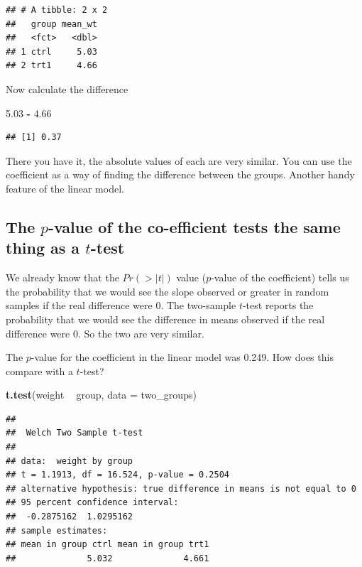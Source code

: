 \documentclass[
]{book}
\newenvironment{Shaded}{\begin{snugshade}}{\end{snugshade}}
\newcommand{\DataTypeTok}[1]{\textcolor[rgb]{0.13,0.29,0.53}{#1}}
\newcommand{\FloatTok}[1]{\textcolor[rgb]{0.00,0.00,0.81}{#1}}
\newcommand{\KeywordTok}[1]{\textcolor[rgb]{0.13,0.29,0.53}{\textbf{#1}}}
\newcommand{\NormalTok}[1]{#1}
\newcommand{\OperatorTok}[1]{\textcolor[rgb]{0.81,0.36,0.00}{\textbf{#1}}}
\newcommand{\StringTok}[1]{\textcolor[rgb]{0.31,0.60,0.02}{#1}}
\begin{document}
\begin{verbatim}
## # A tibble: 2 x 2
##   group mean_wt
##   <fct>   <dbl>
## 1 ctrl     5.03
## 2 trt1     4.66
\end{verbatim}

Now calculate the difference

\begin{Shaded}
\begin{Highlighting}[]
\FloatTok{5.03} \OperatorTok{-}\StringTok{ }\FloatTok{4.66}
\end{Highlighting}
\end{Shaded}

\begin{verbatim}
## [1] 0.37
\end{verbatim}

There you have it, the absolute values of each are very similar. You can use the coefficient as a way of finding the difference between the groups. Another handy feature of the linear model.

\hypertarget{the-p-value-of-the-co-efficient-tests-the-same-thing-as-a-t-test}{%
\subsection{\texorpdfstring{The \(p\)-value of the co-efficient tests the same thing as a \(t\)-test}{The p-value of the co-efficient tests the same thing as a t-test}}\label{the-p-value-of-the-co-efficient-tests-the-same-thing-as-a-t-test}}

We already know that the \(Pr(>|t|)\) value (\(p\)-value of the coefficient) tells us the probability that we would see the slope observed or greater in random samples if the real difference were 0. The two-sample \(t\)-test reports the probability that we would see the difference in means observed if the real difference were 0. So the two are very similar.

The \(p\)-value for the coefficient in the linear model was 0.249. How does this compare with a \(t\)-test?

\begin{Shaded}
\begin{Highlighting}[]
\KeywordTok{t.test}\NormalTok{(weight }\OperatorTok{~}\StringTok{ }\NormalTok{group, }\DataTypeTok{data =}\NormalTok{ two_groups)}
\end{Highlighting}
\end{Shaded}

\begin{verbatim}
## 
## 	Welch Two Sample t-test
## 
## data:  weight by group
## t = 1.1913, df = 16.524, p-value = 0.2504
## alternative hypothesis: true difference in means is not equal to 0
## 95 percent confidence interval:
##  -0.2875162  1.0295162
## sample estimates:
## mean in group ctrl mean in group trt1 
##              5.032              4.661
\end{verbatim}
\end{document}
